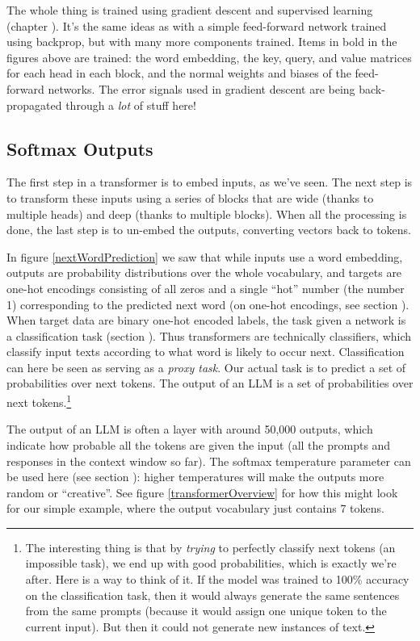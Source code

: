 The whole thing is trained using gradient descent and supervised learning
(chapter ). It's the same ideas as with a simple
feed-forward network trained using backprop, but with many more components
trained. Items in bold in the figures above are trained: the word embedding,
the key, query, and value matrices for each head in each block, and the normal
weights and biases of the feed-forward networks. The error signals used in
gradient descent are being back-propagated through a \emph{lot} of stuff here!

\subsection{Softmax Outputs}\label{llmOutput}

The first step in a transformer is to embed inputs, as we've seen. The next
step is to transform these inputs using a series of blocks that are wide
(thanks to multiple heads) and deep (thanks to multiple blocks). When all the
processing is done, the last step is to un-embed the outputs, converting
vectors back to tokens. 

In figure \ref{nextWordPrediction} we saw that while inputs use a word
embedding, outputs are probability distributions over the whole vocabulary, and
targets are one-hot encodings consisting of all zeros and a single ``hot''
number (the number 1) corresponding to the predicted next word (on one-hot
encodings, see section ). When target data are binary one-hot
encoded labels, the task given a network is a classification task (section
). Thus transformers are technically
classifiers, which classify input texts according to what word is likely to
occur next. Classification can here be seen as serving as a \emph{proxy task}.
Our actual task is to predict a set of probabilities over next tokens. The
output of an LLM is a set of probabilities over next tokens.\footnote{The
interesting thing is that by \emph{trying} to perfectly classify next tokens
(an impossible task), we end up with good probabilities, which is exactly we're
after. Here is a way to think of it. If the model was trained to 100\% accuracy
on the classification task, then it would always generate the same sentences
from the same prompts (because it would assign one unique token to the current
input). But then it could not generate new instances of text.}

The output of an LLM is often a  layer with around 50,000
outputs, which  indicate how probable all the tokens are given the input (all
the prompts and responses in the context window so far). The softmax
temperature parameter can be used here (see section
): higher temperatures will make the outputs more
random or ``creative''. See figure \ref{transformerOverview} for how this might
look for our simple example, where the output vocabulary just contains 7
tokens. 

